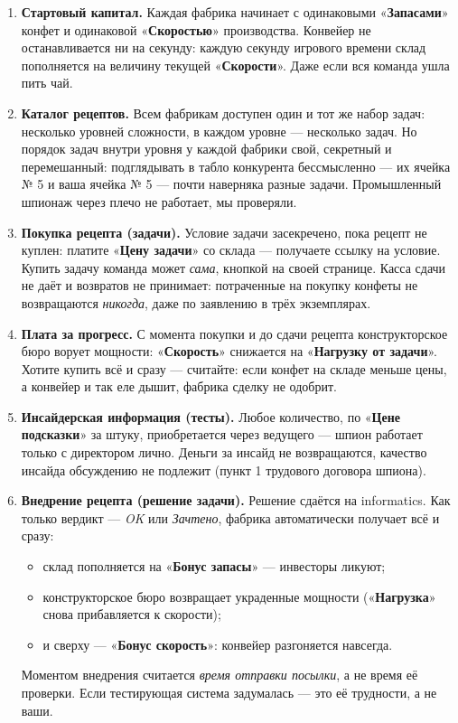 \documentclass[12pt,a4paper]{article}
\newcommand{\term}[1]{«\textbf{#1}»}
\begin{document}
\begin{enumerate}[leftmargin=1.6em,itemsep=2pt]

\item \textbf{Стартовый капитал.} Каждая фабрика начинает с одинаковыми
\term{Запасами} конфет и одинаковой \term{Скоростью} производства.
Конвейер не останавливается ни на секунду: каждую секунду игрового времени
склад пополняется на величину текущей \term{Скорости}. Даже если вся
команда ушла пить чай.

\item \textbf{Каталог рецептов.} Всем фабрикам доступен один и тот же
набор задач: несколько уровней сложности, в каждом уровне --- несколько
задач. Но порядок задач внутри уровня у каждой фабрики свой, секретный
и перемешанный: подглядывать в табло конкурента бессмысленно ---
их ячейка № 5 и ваша ячейка № 5 --- почти наверняка разные задачи.
Промышленный шпионаж через плечо не работает, мы проверяли.

\item \textbf{Покупка рецепта (задачи).} Условие задачи засекречено,
пока рецепт не куплен: платите \term{Цену задачи} со склада --- получаете
ссылку на условие. Купить задачу команда может \emph{сама}, кнопкой
на своей странице. Касса сдачи не даёт и возвратов не принимает:
потраченные на покупку конфеты не возвращаются \emph{никогда},
даже по заявлению в трёх экземплярах.

\item \textbf{Плата за прогресс.} С момента покупки и до сдачи рецепта
конструкторское бюро ворует мощности: \term{Скорость} снижается
на \term{Нагрузку от задачи}. Хотите купить всё и сразу --- считайте:
если конфет на складе меньше цены, а конвейер и так еле дышит,
фабрика сделку не одобрит.

\item \textbf{Инсайдерская информация (тесты).} Любое количество,
по \term{Цене подсказки} за штуку, приобретается через ведущего ---
шпион работает только с директором лично. Деньги за инсайд
не возвращаются, качество инсайда обсуждению не подлежит (пункт 1
трудового договора шпиона).

\item \textbf{Внедрение рецепта (решение задачи).} Решение сдаётся
на informatics. Как только вердикт --- \emph{OK} или \emph{Зачтено},
фабрика автоматически получает всё и сразу:
\begin{itemize}[itemsep=0pt]
	\item склад пополняется на \term{Бонус запасы} --- инвесторы ликуют;
	\item конструкторское бюро возвращает украденные мощности
	(\term{Нагрузка} снова прибавляется к скорости);
	\item и сверху --- \term{Бонус скорость}: конвейер разгоняется навсегда.
\end{itemize}
Моментом внедрения считается \emph{время отправки посылки}, а не время
её проверки. Если тестирующая система задумалась --- это её трудности,
а не ваши.


\end{enumerate}
\end{document}
